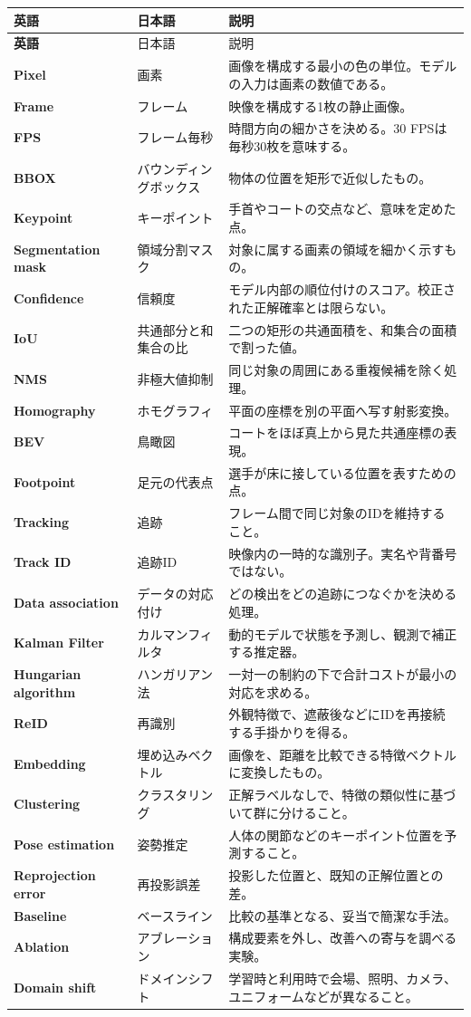 \documentclass[11pt,a4paper,oneside]{report}
\begin{document}
\begin{longtable}{>{\bfseries\RaggedRight}p{3.6cm} p{4.1cm} p{8cm}}
\toprule
英語 & 日本語 & 説明 \\
\midrule
\endfirsthead
\toprule
英語 & 日本語 & 説明 \\
\midrule
\endhead
Pixel & 画素 & 画像を構成する最小の色の単位。モデルの入力は画素の数値である。\\
Frame & フレーム & 映像を構成する1枚の静止画像。\\
FPS & フレーム毎秒 & 時間方向の細かさを決める。30 FPSは毎秒30枚を意味する。\\
BBOX & バウンディングボックス & 物体の位置を矩形で近似したもの。\\
Keypoint & キーポイント & 手首やコートの交点など、意味を定めた点。\\
Segmentation mask & 領域分割マスク & 対象に属する画素の領域を細かく示すもの。\\
Confidence & 信頼度 & モデル内部の順位付けのスコア。校正された正解確率とは限らない。\\
IoU & 共通部分と和集合の比 & 二つの矩形の共通面積を、和集合の面積で割った値。\\
NMS & 非極大値抑制 & 同じ対象の周囲にある重複候補を除く処理。\\
Homography & ホモグラフィ & 平面の座標を別の平面へ写す射影変換。\\
BEV & 鳥瞰図 & コートをほぼ真上から見た共通座標の表現。\\
Footpoint & 足元の代表点 & 選手が床に接している位置を表すための点。\\
Tracking & 追跡 & フレーム間で同じ対象のIDを維持すること。\\
Track ID & 追跡ID & 映像内の一時的な識別子。実名や背番号ではない。\\
Data association & データの対応付け & どの検出をどの追跡につなぐかを決める処理。\\
Kalman Filter & カルマンフィルタ & 動的モデルで状態を予測し、観測で補正する推定器。\\
Hungarian algorithm & ハンガリアン法 & 一対一の制約の下で合計コストが最小の対応を求める。\\
ReID & 再識別 & 外観特徴で、遮蔽後などにIDを再接続する手掛かりを得る。\\
Embedding & 埋め込みベクトル & 画像を、距離を比較できる特徴ベクトルに変換したもの。\\
Clustering & クラスタリング & 正解ラベルなしで、特徴の類似性に基づいて群に分けること。\\
Pose estimation & 姿勢推定 & 人体の関節などのキーポイント位置を予測すること。\\
Reprojection error & 再投影誤差 & 投影した位置と、既知の正解位置との差。\\
Baseline & ベースライン & 比較の基準となる、妥当で簡潔な手法。\\
Ablation & アブレーション & 構成要素を外し、改善への寄与を調べる実験。\\
Domain shift & ドメインシフト & 学習時と利用時で会場、照明、カメラ、ユニフォームなどが異なること。\\
\bottomrule
\end{longtable}
\end{document}
